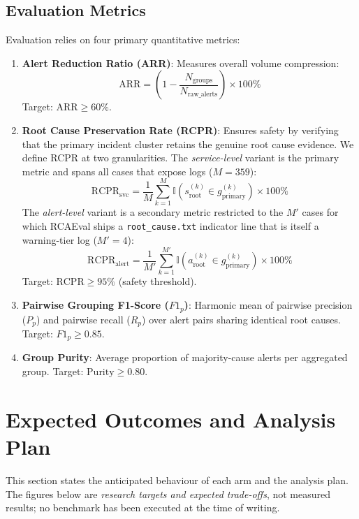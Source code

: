 \documentclass[conference]{IEEEtran}
\begin{document}
\subsection{Evaluation Metrics}
Evaluation relies on four primary quantitative metrics:
\begin{enumerate}
    \item \textbf{Alert Reduction Ratio (ARR)}: Measures overall volume compression:
    \begin{equation}
    \text{ARR} = \left(1 - \frac{N_{\text{groups}}}{N_{\text{raw\_alerts}}}\right) \times 100\%
    \end{equation}
    Target: $\text{ARR} \ge 60\%$.
    
    \item \textbf{Root Cause Preservation Rate (RCPR)}: Ensures safety by verifying that the primary incident cluster retains the genuine root cause evidence. We define RCPR at two granularities. The \emph{service-level} variant is the primary metric and spans all cases that expose logs ($M = 359$):
    \begin{equation}
    \text{RCPR}_{\text{svc}} = \frac{1}{M} \sum_{k=1}^{M} \mathbb{I}\left(s_{\text{root}}^{(k)} \in g_{\text{primary}}^{(k)}\right) \times 100\%
    \end{equation}
    The \emph{alert-level} variant is a secondary metric restricted to the $M'$ cases for which RCAEval ships a \texttt{root\_cause.txt} indicator line that is itself a warning-tier log ($M' = 4$):
    \begin{equation}
    \text{RCPR}_{\text{alert}} = \frac{1}{M'} \sum_{k=1}^{M'} \mathbb{I}\left(a_{\text{root}}^{(k)} \in g_{\text{primary}}^{(k)}\right) \times 100\%
    \end{equation}
    Target: $\text{RCPR} \ge 95\%$ (safety threshold).
    
    \item \textbf{Pairwise Grouping F1-Score ($F1_p$)}: Harmonic mean of pairwise precision ($P_p$) and pairwise recall ($R_p$) over alert pairs sharing identical root causes. Target: $F1_p \ge 0.85$.
    
    \item \textbf{Group Purity}: Average proportion of majority-cause alerts per aggregated group. Target: $\text{Purity} \ge 0.80$.
\end{enumerate}

\section{Expected Outcomes and Analysis Plan}
This section states the anticipated behaviour of each arm and the analysis plan. The figures below are \emph{research targets and expected trade-offs}, not measured results; no benchmark has been executed at the time of writing.
\end{document}
